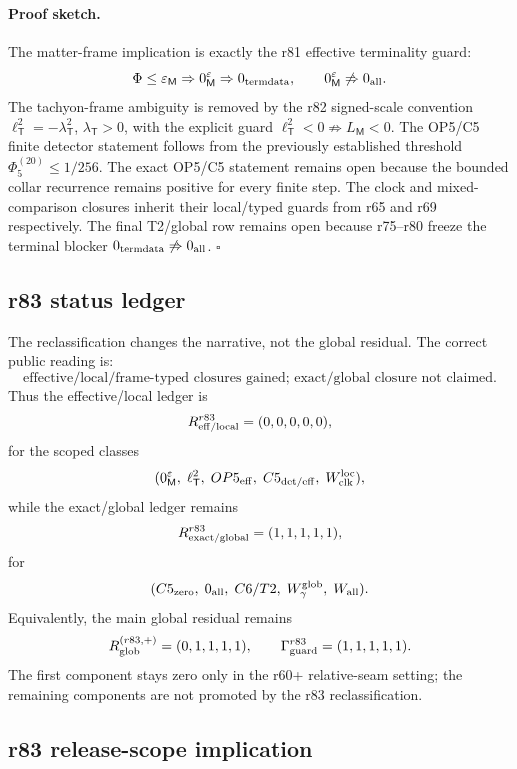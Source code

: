 \paragraph{Proof sketch.}
The matter-frame implication is exactly the r81 effective terminality guard:
\[
\Phi\le\varepsilon_{\mathsf M}\Rightarrow0_{\mathsf M}^{\varepsilon}\Rightarrow0_{\rm termdata},
\qquad
0_{\mathsf M}^{\varepsilon}\not\Rightarrow0_{\rm all}.
\]
The tachyon-frame ambiguity is removed by the r82 signed-scale convention
\(\ell_{\mathsf T}^{2}=-\lambda_{\mathsf T}^{2}\), \(\lambda_{\mathsf T}>0\), with the
explicit guard \(\ell_{\mathsf T}^{2}<0\not\Rightarrow L_{\mathsf M}<0\).  The OP5/C5
finite detector statement follows from the previously established threshold
\(\Phi_5^{(20)}\le1/256\).  The exact OP5/C5 statement remains open because the bounded
collar recurrence remains positive for every finite step.  The clock and mixed-comparison
closures inherit their local/typed guards from r65 and r69 respectively.  The final T2/global
row remains open because r75--r80 freeze the terminal blocker
\(0_{\rm termdata}\not\Rightarrow0_{\rm all}\).  \(\square\)

\subsection*{r83 status ledger}
\label{subsec:r83-status-ledger}

The reclassification changes the narrative, not the global residual.  The correct public
reading is:
\[
\text{effective/local/frame-typed closures gained; exact/global closure not claimed.}
\]
Thus the effective/local ledger is
\[
R_{\rm eff/local}^{r83}=(0,0,0,0,0),
\]
for the scoped classes
\[
(0_{\mathsf M}^{\varepsilon},\;\ell_{\mathsf T}^{2},\;OP5_{\rm eff},\;C5_{\rm det/eff},\;W_{\rm clk}^{\rm loc}),
\]
while the exact/global ledger remains
\[
R_{\rm exact/global}^{r83}=(1,1,1,1,1),
\]
for
\[
(C5_{\rm zero},\;0_{\rm all},\;C6/T2,\;W_{\gamma}^{\rm glob},\;W_{\rm all}).
\]
Equivalently, the main global residual remains
\[
R_{\rm glob}^{(r83,+)}=(0,1,1,1,1),
\qquad
\Gamma_{\rm guard}^{r83}=(1,1,1,1,1).
\]
The first component stays zero only in the r60+ relative-seam setting; the remaining
components are not promoted by the r83 reclassification.

\subsection*{r83 release-scope implication}
\label{subsec:r83-release-scope-implication}

